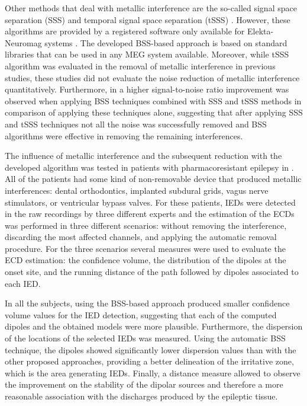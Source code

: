 Other methods that deal with metallic interference are the so-called signal space separation (SSS) \citep{Taulu2004} and temporal signal space separation (tSSS) \citep{Taulu2006}. However, these algorithms are provided by a registered software only available for Elekta-Neuromag systems \citep{GonzalezMoreno2014}. The developed BSS-based approach is based on standard libraries that can be used in any MEG system available. Moreover, while tSSS algorithm was evaluated in the removal of metallic interference in previous studies, \citep{Hillebrand2013,Song2009,Alexpoulos2013} these studies did not evaluate the noise reduction of metallic interference quantitatively. Furthermore, in \citep{GonzalezMoreno2014} a higher signal-to-noise ratio improvement was observed when applying BSS techniques combined with SSS and tSSS methods in comparison of applying these techniques alone, suggesting that after applying SSS and tSSS techniques not all the noise was successfully removed and BSS algorithms were effective in removing the remaining interferences. 

The influence of metallic interference and the subsequent reduction with the developed algorithm was tested in patients with pharmacoresistant epilepsy in \citep{Migliorelli2016}. All of the patients had some kind of non-removable device that produced metallic interferences: dental orthodontics, implanted subdural grids, vagus nerve stimulators, or ventricular bypass valves. For these patients, IEDs were detected in the raw recordings by three different experts and the estimation of the ECDs was performed in three different scenarios: without removing the interference, discarding the most affected channels, and applying the automatic removal procedure. For the three scenarios several measures were used to evaluate the ECD estimation: the confidence volume, the distribution of the dipoles at the onset site, and the running distance of the path followed by dipoles associated to each IED.

In all the subjects, using the BSS-based approach produced smaller confidence volume values for the IED detection, suggesting that each of the computed dipoles and the obtained models were more plausible. Furthermore, the dispersion of the locations of the selected IEDs was measured. Using the automatic BSS technique, the dipoles showed significantly lower dispersion values than with the other proposed approaches, providing a better delineation of the irritative zone, which is the area generating IEDs. Finally, a distance measure allowed to observe the improvement on the stability of the dipolar sources and therefore a more reasonable association with the discharges produced by the epileptic tissue. 

